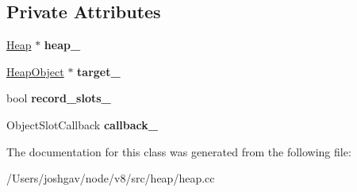 \subsection*{Private Attributes}
\begin{DoxyCompactItemize}
\item 
\hyperlink{classv8_1_1internal_1_1_heap}{Heap} $\ast$ {\bfseries heap\+\_\+}\hypertarget{classv8_1_1internal_1_1_iterate_promoted_objects_visitor_a2903c2877e7e313ad70ea58a8af78fd3}{}\label{classv8_1_1internal_1_1_iterate_promoted_objects_visitor_a2903c2877e7e313ad70ea58a8af78fd3}

\item 
\hyperlink{classv8_1_1internal_1_1_heap_object}{Heap\+Object} $\ast$ {\bfseries target\+\_\+}\hypertarget{classv8_1_1internal_1_1_iterate_promoted_objects_visitor_aa4fdc0fdf8e07ddc974fa8b5bd6aa174}{}\label{classv8_1_1internal_1_1_iterate_promoted_objects_visitor_aa4fdc0fdf8e07ddc974fa8b5bd6aa174}

\item 
bool {\bfseries record\+\_\+slots\+\_\+}\hypertarget{classv8_1_1internal_1_1_iterate_promoted_objects_visitor_a1bf71881dd5aa32432d8011748ad07a0}{}\label{classv8_1_1internal_1_1_iterate_promoted_objects_visitor_a1bf71881dd5aa32432d8011748ad07a0}

\item 
Object\+Slot\+Callback {\bfseries callback\+\_\+}\hypertarget{classv8_1_1internal_1_1_iterate_promoted_objects_visitor_ae3bacd2ec3f911f7622d6e6edaa639b6}{}\label{classv8_1_1internal_1_1_iterate_promoted_objects_visitor_ae3bacd2ec3f911f7622d6e6edaa639b6}

\end{DoxyCompactItemize}


The documentation for this class was generated from the following file\+:\begin{DoxyCompactItemize}
\item 
/\+Users/joshgav/node/v8/src/heap/heap.\+cc\end{DoxyCompactItemize}
